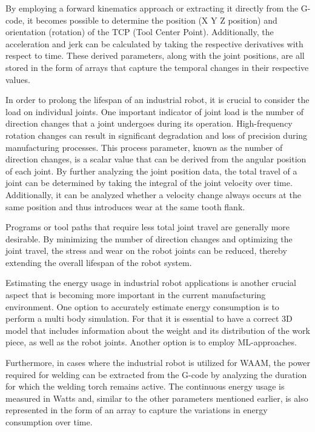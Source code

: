 By employing a forward kinematics approach or extracting it directly from the G-code, it becomes possible to determine the position (X Y Z position) and orientation (rotation) of the TCP (Tool Center Point). Additionally, the acceleration and jerk can be calculated by taking the respective derivatives with respect to time. These derived parameters, along with the joint positions, are all stored in the form of arrays that capture the temporal changes in their respective values.

In order to prolong the lifespan of an industrial robot, it is crucial to consider the load on individual joints. One important indicator of joint load is the number of direction changes that a joint undergoes during its operation. High-frequency rotation changes can result in significant degradation and loss of precision during manufacturing processes.
This process parameter, known as the number of direction changes, is a scalar value that can be derived from the angular position of each joint. By further analyzing the joint position data, the total travel of a joint can be determined by taking the integral of the joint velocity over time.
Additionally, it can be analyzed whether a velocity change always occurs at the same position and thus introduces wear at the same tooth flank.

Programs or tool paths that require less total joint travel are generally more desirable. By minimizing the number of direction changes and optimizing the joint travel, the stress and wear on the robot joints can be reduced, thereby extending the overall lifespan of the robot system.


Estimating the energy usage in industrial robot applications is another crucial aspect that is becoming more important in the current manufacturing environment. One option to accurately estimate energy consumption is to perform a multi body simulation. For that it is essential to have a correct 3D model that includes information about the weight and its distribution of the work piece, as well as the robot joints. Another option is to employ ML-approaches.

Furthermore, in cases where the industrial robot is utilized for WAAM, the power required for welding can be extracted from the G-code by analyzing the duration for which the welding torch remains active. The continuous energy usage is measured in Watts and, similar to the other parameters mentioned earlier, is also represented in the form of an array to capture the variations in energy consumption over time.

